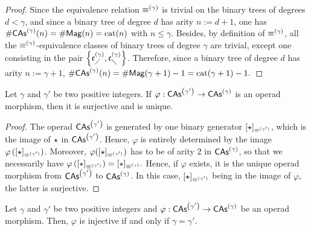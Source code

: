 \begin{proof}
    Since the equivalence relation $\operatorname{\equiv}^{(\gamma)}$ is trivial on the
    binary trees of degrees $d < \gamma$, and since a binary tree of
    degree $d$ has arity $n := d + 1$, one has
    $\# \mathsf{CAs}^{\left(\gamma\right)}(n) = \# \mathsf{Mag}(n) = \mathrm{cat}(n)$ with $n \leq \gamma$.
    Besides, by definition of $\operatorname{\equiv}^{(\gamma)}$, all the
    $\operatorname{\equiv}^{(\gamma)}$-equivalence classes of binary trees of degree
    $\gamma$ are trivial, except one consisting in the pair
    $\left\{\mathfrak{c}^{\left(\gamma\right)}_{\diagup}, \mathfrak{c}^{\left(\gamma\right)}_{\diagdown}\right\}$. Therefore, since a
    binary tree of degree $d$ has arity $n := \gamma + 1$,
    \begin{math}
        \# \mathsf{CAs}^{\left(\gamma\right)}(n)
        = \# \mathsf{Mag}(\gamma + 1) - 1
        = \mathrm{cat}(\gamma + 1) - 1.
    \end{math}
\end{proof}
\medbreak

\begin{Lemma} \label{lem:surjective_morphisms_CAs}
    Let $\gamma$ and $\gamma'$ be two positive integers. If
    $\varphi:\mathsf{CAs}^{\left(\gamma'\right)} \to \mathsf{CAs}^{\left(\gamma\right)}$ is an operad morphism, then
    it is surjective and is unique.
\end{Lemma}

\begin{proof}
    The operad $\mathsf{CAs}^{\left(\gamma'\right)}$ is generated by one binary generator
    $[\operatorname{\star}]_{\operatorname{\equiv}^{(\gamma')}}$, which is the image of $\operatorname{\star}$
    in $\mathsf{CAs}^{\left(\gamma'\right)}$. Hence, $\varphi$ is entirely determined by the
    image $\varphi\left([\operatorname{\star}]_{\operatorname{\equiv}^{(\gamma')}}\right)$.
    Moreover, $\varphi([\operatorname{\star}]_{\operatorname{\equiv}^{(\gamma')}})$ has to be of
    arity $2$ in $\mathsf{CAs}^{\left(\gamma\right)}$, so that we necessarily have
    \begin{math}
        \varphi\left([\operatorname{\star}]_{\operatorname{\equiv}^{(\gamma')}}\right)
        =
        [\operatorname{\star}]_{\operatorname{\equiv}^{(\gamma)}}.
    \end{math}
    Hence, if $\varphi$ exists, it is the unique operad morphism from
    $\mathsf{CAs}^{\left(\gamma'\right)}$ to $\mathsf{CAs}^{\left(\gamma\right)}$. In this case,
    $[\operatorname{\star}]_{\operatorname{\equiv}^{(\gamma')}}$ being in the image of $\varphi$,
    the latter is surjective.
\end{proof}
\medbreak

\begin{Lemma} \label{lem:injective_morphisms_CAs}
    Let $\gamma$ and $\gamma'$ be two positive integers and
    $\varphi:\mathsf{CAs}^{\left(\gamma'\right)} \to \mathsf{CAs}^{\left(\gamma\right)}$ be an operad morphism.
    Then, $\varphi$ is injective if and only if $\gamma = \gamma'$.
\end{Lemma}

